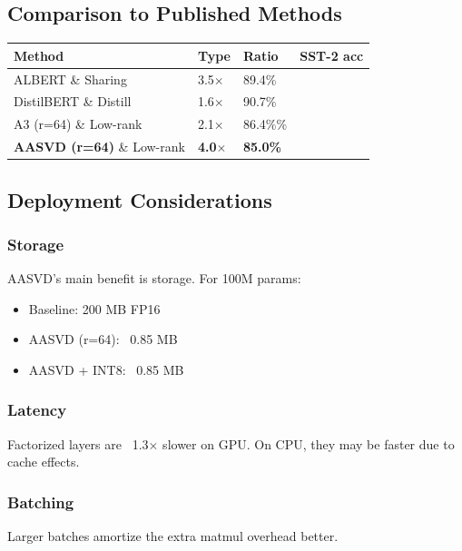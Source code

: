 \subsection{Comparison to Published Methods}

\begin{table}[H]
\centering
\small
\begin{tabular}{llll}
\toprule
\textbf{Method} & \textbf{Type} & \textbf{Ratio} & \textbf{SST-2 acc} \\
\midrule
ALBERT \& Sharing & 3.5$\times$ & 89.4\% \\
DistilBERT \& Distill & 1.6$\times$ & 90.7\% \\
A3 (r=64) \& Low-rank & 2.1$\times$ & 86.4\%\% \\
\textbf{AASVD (r=64)} \& Low-rank & \textbf{4.0$\times$} & \textbf{85.0\%} \\
\bottomrule
\end{tabular}
\end{table}

\subsection{Deployment Considerations}

\subsubsection{Storage}

AASVD's main benefit is storage. For 100M params:
\begin{itemize}
\item Baseline: 200 MB FP16
\item AASVD (r=64): ~0.85 MB
\item AASVD + INT8: ~0.85 MB

\end{itemize}
\subsubsection{Latency}

Factorized layers are ~1.3$\times$ slower on GPU. On CPU, they may 
be faster due to cache effects.

\subsubsection{Batching}

Larger batches amortize the extra matmul overhead better.

